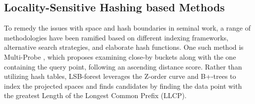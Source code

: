 \documentclass[11pt]{article}
\begin{document}
\subsection{Locality-Sensitive Hashing based Methods}
%
To remedy the issues with space and hash boundaries in seminal work, a range of methodologies have been ramified based on different indexing frameworks, alternative search strategies, and elaborate hash functions. One such method is Multi-Probe \cite{Multi-probe}, which proposes examining close-by buckets along with the one containing the query point, following an ascending distance score. Rather than utilizing hash tables, LSB-forest \cite{DBLP:conf/sigmod/TaoYSK09} leverages the Z-order curve and B+-trees to index the projected spaces and finds candidates by finding the data point with the greatest Length of the Longest Common Prefix (LLCP). 
\end{document}
